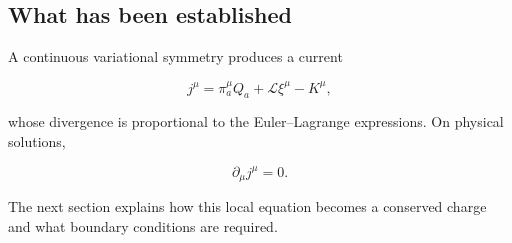 \subsection{What has been established}

A continuous variational symmetry produces a current

\[
j^{\mu}
=
\pi_a^{\mu}Q_a
+
\mathcal{L}\xi^{\mu}
-
K^{\mu},
\]

whose divergence is proportional to the Euler--Lagrange expressions. On physical solutions,

\[
\partial_{\mu}j^{\mu}=0.
\]

The next section explains how this local equation becomes a conserved charge and what boundary conditions are required.

